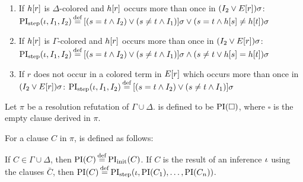 \begin{defi}[$\PIstep$]
\begin{indproof}
			\begin{enumerate}
				\item If $h[r]$ is $\Delta$-colored and $h[r]$ occurs more than once in $(I_2 \lor E[r])\sigma$:
					\label{def:PI_paramod_1}
					\newline
					$\PIstep(\inference, I_1, I_2) \defeq{} [ ( s=t \land I_2 ) \lor (s\neq t \land I_1) ]\sigma \lor (s=t \land h\occur{s} \neq      h\occur{t})\sigma$
				\item If $h[r]$ is $\Gamma$-colored and $h[r]$ occurs more than once in $(I_2 \lor E[r])\sigma$:
					\label{def:PI_paramod_2}
					\newline
					$\PIstep(\inference, I_1, I_2) \defeq{} [ ( s=t \land I_2 ) \lor (s\neq t \land I_1) ]\sigma \land (s\neq t \lor h\occur{s} =     h\occur{t})\sigma$
				\item If $r$ does not occur in a colored term in $E[r]$ which occurs more than once in\nolinebreak{} $(I_2 \lor E[r])\sigma$:
					\label{def:PI_paramod_3}
					\newline
					$\PIstep(\inference, I_1, I_2) \defeq{} [ ( s=t \land I_2 ) \lor (s\neq t \land I_1) ]\sigma$ \qedhere

			\end{enumerate}

	\end{indproof}

\end{defi}



\begin{defi}
	\label{def:PI}
	Let $\pi$ be a resolution refutation of $\Gamma \cup \Delta$.
	 is defined to be $\operatorname{PI}(\square)$, where $\square$ is the empty clause derived in $\pi$.

	For a clause $C$ in $\pi$,  is defined as follows:
	\begin{indproof}
			If $C \in \Gamma\cup\Delta$, then $\PI(C) \defeq \PIinit(C)$.
			If $C$ is the result of an inference $\iota$ using the clauses $\bar C$, then $\PI(C) \defeq \PIstep(\inference, \PI(C_1), \dots, \PI(C_n))$.
	\end{indproof}
\end{defi}

